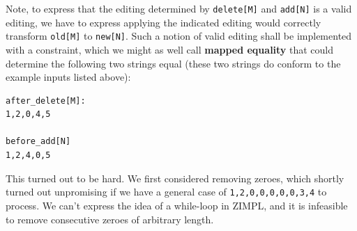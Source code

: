 \documentclass{article}
\begin{document}
Note, to express that the editing determined by \texttt{delete[M]} and \texttt{add[N]} is a valid editing, we have to express applying the indicated editing would correctly transform \texttt{old[M]} to \texttt{new[N]}. Such a notion of valid editing shall be implemented with a constraint, which we might as well call \textbf{mapped equality} that could determine the following two strings equal (these two strings do conform to the example inputs listed above):
\begin{lstlisting}
after_delete[M]:
1,2,0,4,5

before_add[N]
1,2,4,0,5
\end{lstlisting}
This turned out to be hard. We first considered removing zeroes, which shortly turned out unpromising if we have a general case of \texttt{1,2,0,0,0,0,0,3,4} to process. We can't express the idea of a while-loop in ZIMPL, and it is infeasible to remove consecutive zeroes of arbitrary length. \\
\end{document}
